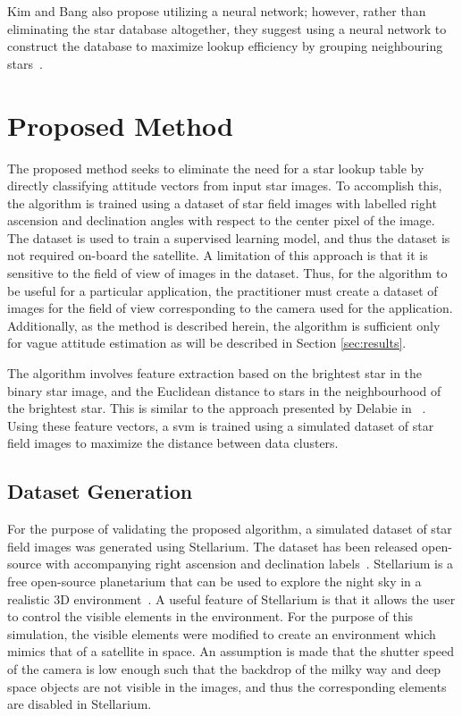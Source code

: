 \documentclass[10pt,twocolumn,letterpaper]{article}
\begin{document}
Kim and Bang also propose utilizing a neural network; however, rather than eliminating the star database altogether, they suggest using a neural network to construct the database to maximize lookup efficiency by grouping neighbouring stars~\cite{neural2}.




\section{Proposed Method}
\label{sec:method}

The proposed method seeks to eliminate the need for a star lookup table by directly classifying attitude vectors from input star images. To accomplish this, the algorithm is trained using a dataset of star field images with labelled right ascension and declination angles with respect to the center pixel of the image. The dataset is used to train a supervised learning model, and thus the dataset is not required on-board the satellite. A limitation of this approach is that it is sensitive to the field of view of images in the dataset. Thus, for the algorithm to be useful for a particular application, the practitioner must create a dataset of images for the field of view corresponding to the camera used for the application. Additionally, as the method is described herein, the algorithm is sufficient only for vague attitude estimation as will be described in Section \ref{sec:results}.

The algorithm involves feature extraction based on the brightest star in the binary star image, and the Euclidean distance to stars in the neighbourhood of the brightest star. This is similar to the approach presented by Delabie \etal in ~\cite{optimal}. Using these feature vectors, a \acrfull{svm} is trained using a simulated dataset of star field images to maximize the distance between data clusters.


\subsection{Dataset Generation}

For the purpose of validating the proposed algorithm, a simulated dataset of star field images was generated using Stellarium. The dataset has been released open-source with accompanying right ascension and declination labels~\cite{kaggle}. Stellarium is a free open-source planetarium that can be used to explore the night sky in a realistic 3D environment~\cite{stellarium}. A useful feature of Stellarium is that it allows the user to control the visible elements in the environment. For the purpose of this simulation, the visible elements were modified to create an environment which mimics that of a satellite in space. An assumption is made that the shutter speed of the camera is low enough such that the backdrop of the milky way and deep space objects are not visible in the images, and thus the corresponding elements are disabled in Stellarium.
\end{document}
